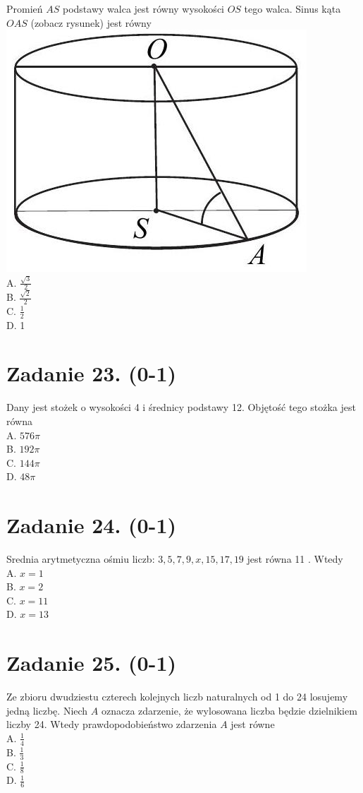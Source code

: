 \documentclass[10pt]{article}
\begin{document}
Promień \(A S\) podstawy walca jest równy wysokości \(O S\) tego walca. Sinus kąta \(O A S\) (zobacz rysunek) jest równy\\
\includegraphics[max width=\textwidth, center]{2024_11_21_7b5527312ea89ae66fd0g-14}\\
A. \(\frac{\sqrt{3}}{2}\)\\
B. \(\frac{\sqrt{2}}{2}\)\\
C. \(\frac{1}{2}\)\\
D. 1

\section*{Zadanie 23. (0-1)}
Dany jest stożek o wysokości 4 i średnicy podstawy 12. Objętość tego stożka jest równa\\
A. \(576 \pi\)\\
B. \(192 \pi\)\\
C. \(144 \pi\)\\
D. \(48 \pi\)

\section*{Zadanie 24. (0-1)}
Srednia arytmetyczna ośmiu liczb: \(3,5,7,9, x, 15,17,19\) jest równa 11 . Wtedy\\
A. \(x=1\)\\
B. \(x=2\)\\
C. \(x=11\)\\
D. \(x=13\)

\section*{Zadanie 25. (0-1)}
Ze zbioru dwudziestu czterech kolejnych liczb naturalnych od 1 do 24 losujemy jedną liczbę. Niech \(A\) oznacza zdarzenie, że wylosowana liczba będzie dzielnikiem liczby 24. Wtedy prawdopodobieństwo zdarzenia \(A\) jest równe\\
A. \(\frac{1}{4}\)\\
B. \(\frac{1}{3}\)\\
C. \(\frac{1}{8}\)\\
D. \(\frac{1}{6}\)
\end{document}
